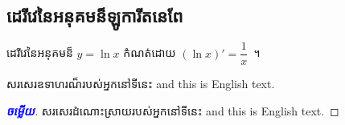 \documentclass[a5paper,leqno,fleqn]{book}
\newcommand{\answer}{\textcolor{blue}{\bfseries ចម្លើយ}}
\begin{document}
	\subsection{ដេរីវេនៃអនុគមន៏ឡូការីតនេពែ}
	\vspace{1ex}
	\begin{multicols}{2}
	\begin{definition}{}{}
		ដេរីវេនៃអនុគមន៏ $ y=\ln x $ កំណត់ដោយ $ (\ln x)'=\dfrac{1}{x} $~។
	\end{definition}
	\begin{example}{}{}
		សរសេរឧទាហរណ៏របស់អ្នកនៅទីនេះ \textenglish{and this is English text.}
	\end{example}
	\end{multicols}
	\begin{proof}[\answer]
		សរសេរដំណោះស្រាយរបស់អ្នកនៅទីនេះ \textenglish{and this is English text.}
	\end{proof}
\end{document}
